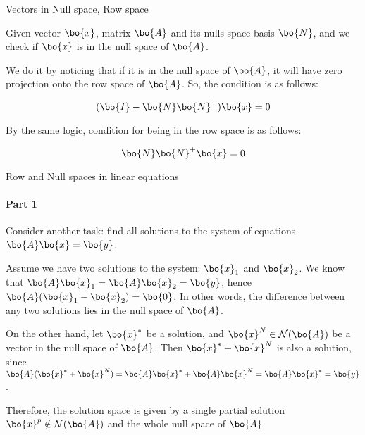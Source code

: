 \documentclass{beamer}
\begin{document}
\begin{frame}{Vectors in Null space, Row space}
\begin{flushleft}

Given vector $\bo{x}$, matrix $\bo{A}$ and its nulls space basis $\bo{N}$, and we check if $\bo{x}$ is in the null space of $\bo{A}$. 

\bigskip

We do it by noticing that if it is in the null space of $\bo{A}$, it will have zero projection onto the row space of $\bo{A}$. So, the condition is as follows:

\begin{equation}
    (\bo{I} - \bo{N} \bo{N}^+) \bo{x} = 0
\end{equation}

By the same logic, condition for being in the row space is as follows:

\begin{equation}
    \bo{N} \bo{N}^+ \bo{x} = 0
\end{equation}


\end{flushleft}
\end{frame}







\begin{frame}{Row and Null spaces in linear equations}
\framesubtitle{Part 1}
\begin{flushleft}

Consider another task: find all solutions to the system of equations $\bo{A} \bo{x} = \bo{y}$.

\bigskip

Assume we have two solutions to the system: $\bo{x}_1$ and $\bo{x}_2$. We know that $\bo{A} \bo{x}_1 = \bo{A} \bo{x}_2= \bo{y}$, hence $\bo{A} (\bo{x}_1 - \bo{x}_2) = \bo{0}$. In other words, the difference between any two solutions lies in the null space of $\bo{A}$.

\bigskip

On the other hand, let $\bo{x}^*$ be a solution, and $\bo{x}^N \in \mathcal{N}(\bo{A})$ be a vector in the null space of $\bo{A}$. Then $\bo{x}^* + \bo{x}^N$ is also a solution, since $\bo{A} (\bo{x}^* + \bo{x}^N) = \bo{A} \bo{x}^* + \bo{A} \bo{x}^N = \bo{A} \bo{x}^* = \bo{y}$.

\bigskip

Therefore, the solution space is given by a single partial solution $\bo{x}^p \notin \mathcal{N}(\bo{A})$ and the whole null space of $\bo{A}$.

\end{flushleft}
\end{frame}
\end{document}
